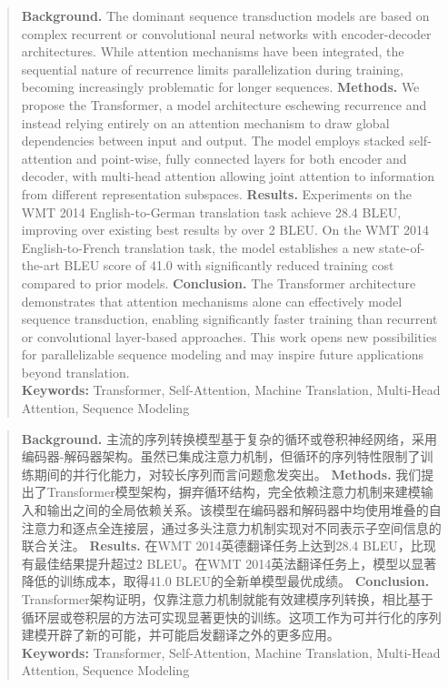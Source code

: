 \begin{abstract}
\textbf{Background.} The dominant sequence transduction models are based on complex recurrent or convolutional neural networks with encoder-decoder architectures. While attention mechanisms have been integrated, the sequential nature of recurrence limits parallelization during training, becoming increasingly problematic for longer sequences.
\textbf{Methods.} We propose the Transformer, a model architecture eschewing recurrence and instead relying entirely on an attention mechanism to draw global dependencies between input and output. The model employs stacked self-attention and point-wise, fully connected layers for both encoder and decoder, with multi-head attention allowing joint attention to information from different representation subspaces.
\textbf{Results.} Experiments on the WMT 2014 English-to-German translation task achieve 28.4 BLEU, improving over existing best results by over 2 BLEU. On the WMT 2014 English-to-French translation task, the model establishes a new state-of-the-art BLEU score of 41.0 with significantly reduced training cost compared to prior models.
\textbf{Conclusion.} The Transformer architecture demonstrates that attention mechanisms alone can effectively model sequence transduction, enabling significantly faster training than recurrent or convolutional layer-based approaches. This work opens new possibilities for parallelizable sequence modeling and may inspire future applications beyond translation.
\\
\textbf{Keywords:} Transformer, Self-Attention, Machine Translation, Multi-Head Attention, Sequence Modeling
\end{abstract}

\begin{abstract}
\textbf{Background.} 主流的序列转换模型基于复杂的循环或卷积神经网络，采用编码器-解码器架构。虽然已集成注意力机制，但循环的序列特性限制了训练期间的并行化能力，对较长序列而言问题愈发突出。
\textbf{Methods.} 我们提出了Transformer模型架构，摒弃循环结构，完全依赖注意力机制来建模输入和输出之间的全局依赖关系。该模型在编码器和解码器中均使用堆叠的自注意力和逐点全连接层，通过多头注意力机制实现对不同表示子空间信息的联合关注。
\textbf{Results.} 在WMT 2014英德翻译任务上达到28.4 BLEU，比现有最佳结果提升超过2 BLEU。在WMT 2014英法翻译任务上，模型以显著降低的训练成本，取得41.0 BLEU的全新单模型最优成绩。
\textbf{Conclusion.} Transformer架构证明，仅靠注意力机制就能有效建模序列转换，相比基于循环层或卷积层的方法可实现显著更快的训练。这项工作为可并行化的序列建模开辟了新的可能，并可能启发翻译之外的更多应用。
\\
\textbf{Keywords:} Transformer, Self-Attention, Machine Translation, Multi-Head Attention, Sequence Modeling
\end{abstract}


